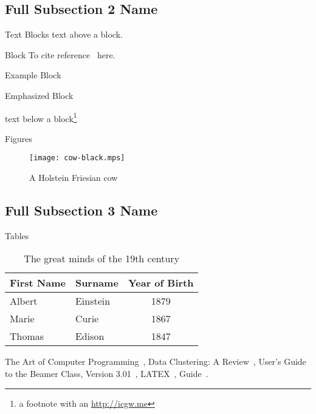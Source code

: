 \documentclass[]{beamer}
\let\cite\autocite
\begin{document}
\subsection[Short Subsection 2 Name]{Full Subsection 2 Name}

\begin{frame}{Text Blocks}
  text above a block.
  \begin{block}{Block}
    To cite reference~\cite{icgw:ucas/beamer} here.
  \end{block}
  \begin{exampleblock}{Example Block}
  \end{exampleblock}
  \begin{alertblock}{Emphasized Block}
  \end{alertblock}
  text below a block\footnote{a footnote with an \url{http://icgw.me}}
\end{frame}

\begin{frame}{Figures}
  \begin{figure}
    \texttt{[image: cow-black.mps]}
    \caption{A Holstein Friesian cow}
  \end{figure}
\end{frame}

\subsection[Short Subsection 3 Name]{Full Subsection 3 Name}

\begin{frame}{Tables}
  \begin{table}
    \begin{tabular}{llc}
      First Name & Surname  & Year of Birth \\ \midrule
      Albert     & Einstein & 1879          \\
      Marie      & Curie    & 1867          \\
      Thomas     & Edison   & 1847          \\
    \end{tabular}
    \caption{The great minds of the 19th century}
  \end{table}
  The Art of Computer Programming~\cite{DBLP:books/aw/Knuth73}, Data Clustering: {A} Review~\cite{DBLP:journals/csur/JainMF99}, User's Guide to the Beamer Class, Version 3.01~\cite{tantau2004user}, LATEX~\cite{lamport1994latex}, Guide~\cite{kopka1995guide}.
\end{frame}
\end{document}
